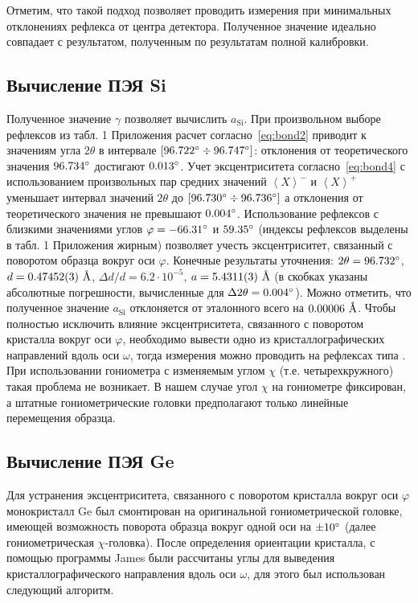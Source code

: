 Отметим, что такой подход позволяет проводить измерения при минимальных отклонениях рефлекса от центра детектора.
Полученное значение идеально совпадает с результатом, полученным по результатам полной калибровки.

\subsection{Вычисление ПЭЯ Si}

Полученное значение $\gamma$ позволяет вычислить $a_\text{Si}$.
При произвольном выборе рефлексов из табл. 1 Приложения расчет согласно~\ref{eq:bond2} приводит к значениям угла $2\theta$ в интервале $[96.722^\circ\div96.747^\circ]$: отклонения от теоретического значения $96.734^\circ$ достигают $0.013^\circ$.
Учет эксцентриситета согласно~\ref{eq:bond4} с использованием произвольных пар средних значений $\left<X\right>^-$ и $\left<X\right>^+$ уменьшает интервал значений $2\theta$ до $[96.730^\circ\div96.736^\circ]$ а отклонения от теоретического значения не превышают $0.004^\circ$.
Использование рефлексов с близкими значениями углов $\varphi = -66.31^\circ$ и $59.35^\circ$ (индексы рефлексов выделены в табл. 1 Приложения жирным) позволяет учесть эксцентриситет, связанный с поворотом образца вокруг оси $\varphi$.
Конечные результаты уточнения: $2\theta = 96.732^\circ$, $d = 0.47452 (3)\ \text{\AA}$, $\Delta d / d = 6.2 \cdot 10^{-5}$, $a = 5.4311(3)\ \text{\AA}$ (в скобках указаны абсолютные погрешности, вычисленные для $\Delta 2 \theta = 0.004^\circ$).
Можно отметить, что полученное значение $a_\text{Si}$ отклоняется от эталонного всего на $0.00006\ \text{\AA}$.
Чтобы полностью исключить влияние эксцентриситета, связанного с поворотом кристалла вокруг оси $\varphi$, необходимо вывести одно из кристаллографических направлений вдоль оси $\omega$, тогда измерения можно проводить на рефлексах типа .
При использовании гониометра с изменяемым углом $\chi$ (т.е. четырехкружного) такая проблема не возникает.
В нашем случае угол $\chi$ на гониометре фиксирован, а штатные гониометрические головки предполагают только линейные перемещения образца.

\subsection{Вычисление ПЭЯ Ge}

Для устранения эксцентриситета, связанного с поворотом кристалла вокруг оси $\varphi$ монокристалл Ge был смонтирован на оригинальной гониометрической головке, имеющей возможность поворота образца вокруг одной оси на $\pm 10^\circ$ (далее гониометрическая $\chi$-головка).
После определения ориентации кристалла, с помощью программы James были рассчитаны углы для выведения кристаллографического направления вдоль оси $\omega$, для этого был использован следующий алгоритм.

